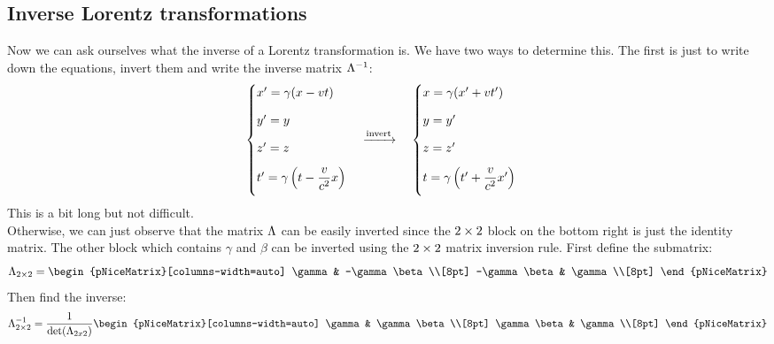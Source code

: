 \subsection{Inverse Lorentz transformations}
Now we can ask ourselves what the inverse of a Lorentz transformation is. We have two ways to determine this. The first is just to write down the equations, invert them and write the inverse matrix $\Lambda^{-1}$:
\begin{equation}
  \begin{cases}
    x' = \gamma(x - vt)\\[8pt]
    y'=y \\[8pt]
    z'=z \\[8pt]
    t' = \gamma\left(t - \dfrac{v}{c^2}x\right) \\[8pt]
  \end{cases}
  \xrightarrow{\text{invert}} \quad
  \begin{cases}
    x = \gamma(x' + vt') \\[8pt]
    y = y' \\[8pt]
    z = z' \\[8pt]
    t = \gamma\left(t' + \dfrac{v}{c^2}x'\right) \\[8pt]
  \end{cases}
\end{equation}
This is a bit long but not difficult.\\
\STOP Otherwise, we can just observe that the matrix $\Lambda$ can be easily inverted since the $2 \times 2$ block on the bottom right is just the identity matrix. The other block which contains $\gamma$ and $\beta$ can be inverted using the $2 \times 2$ matrix inversion rule. First define the submatrix:
\begin{equation}
  \lm_{2 \by 2} = \begin{pNiceMatrix}[columns-width=auto]
    \gamma & -\gamma \beta \\[8pt]
    -\gamma \beta & \gamma \\[8pt]
  \end{pNiceMatrix}
\end{equation}
Then find the inverse:
\begin{equation}
  \invlm_{2 \by 2} = \dfrac{1}{\det(\lm_{2x2})}\begin{pNiceMatrix}[columns-width=auto]
    \gamma & \gamma \beta \\[8pt]
    \gamma \beta & \gamma \\[8pt]
  \end{pNiceMatrix}
\end{equation}
